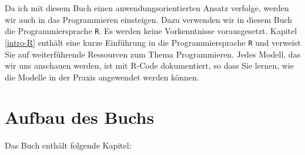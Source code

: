 \documentclass[
]{book}
\begin{document}
Da ich mit diesem Buch einen anwendungsorientierten Ansatz verfolge, werden wir auch in das Programmieren einsteigen. Dazu verwenden wir in diesem Buch die Programmiersprache \texttt{R}. Es werden keine Vorkenntnisse vorausgesetzt. Kapitel \ref{intro-R} enthält eine kurze Einführung in die Programmiersprache \texttt{R} und verweist Sie auf weiterführende Ressourcen zum Thema Programmieren. Jedes Modell, das wir uns anschauen werden, ist mit R-Code dokumentiert, so dass Sie lernen, wie die Modelle in der Praxis angewendet werden können.

\hypertarget{aufbau-des-buchs}{%
\section*{Aufbau des Buchs}\label{aufbau-des-buchs}}

Das Buch enthält folgende Kapitel:
\end{document}
